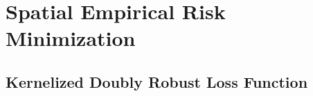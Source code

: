 \documentclass[12pt]{article}
\newcommand{\XL}[1]{{\color{blue}from Xindi: #1}}
\begin{document}














\section{Spatial Empirical Risk Minimization}\label{sec:estimator}

\subsection{Kernelized Doubly Robust Loss Function} 
\label{sec:direct_method}
\end{document}
